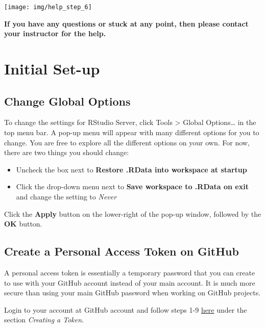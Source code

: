 \documentclass[
]{book}
\begin{document}
\begin{center}\texttt{[image: img/help\_step\_6]} \end{center}

\textbf{If you have any questions or stuck at any point, then please contact your instructor for the help.}

\hypertarget{initial-set-up}{%
\section{Initial Set-up}\label{initial-set-up}}

\hypertarget{change-global-options}{%
\subsection{Change Global Options}\label{change-global-options}}

To change the settings for RStudio Server, click Tools \textgreater{} Global Options\ldots{} in the top menu bar. A pop-up menu will appear with many different options for you to change. You are free to explore all the different options on your own. For now, there are two things you should change:

\begin{itemize}
\item
  Uncheck the box next to \textbf{Restore .RData into workspace at startup}
\item
  Click the drop-down menu next to \textbf{Save workspace to .RData on exit} and change the setting to \emph{Never}
\end{itemize}

Click the \textbf{Apply} button on the lower-right of the pop-up window, followed by the \textbf{OK} button.

\hypertarget{create-a-personal-access-token-on-github}{%
\subsection{Create a Personal Access Token on GitHub}\label{create-a-personal-access-token-on-github}}

A personal access token is essentially a temporary password that you can create to use with your GitHub account instead of your main account. It is much more secure than using your main GitHub password when working on GitHub projects.

Login to your account at GitHub account and follow steps 1-9 \href{https://docs.github.com/en/github/authenticating-to-github/keeping-your-account-and-data-secure/creating-a-personal-access-token}{here} under the section \emph{Creating a Token}.
\end{document}

